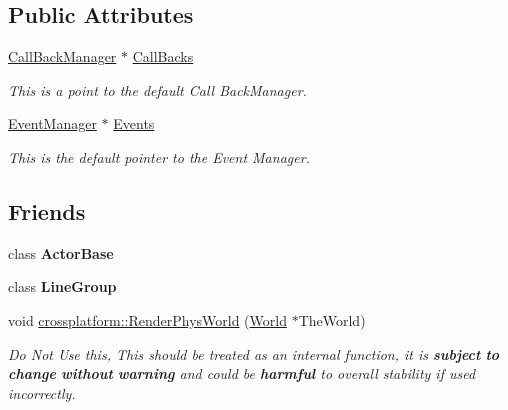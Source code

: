 \subsection*{Public Attributes}
\begin{DoxyCompactItemize}
\item 
\hyperlink{classphys_1_1CallBackManager}{CallBackManager} $\ast$ \hyperlink{classphys_1_1World_a22a1624c63198f49fdf8e448881bdb2e}{CallBacks}
\begin{DoxyCompactList}\small\item\em This is a point to the default Call BackManager. \item\end{DoxyCompactList}\item 
\hyperlink{classphys_1_1EventManager}{EventManager} $\ast$ \hyperlink{classphys_1_1World_ad0b13f1f3caf0342f56671b522543453}{Events}
\begin{DoxyCompactList}\small\item\em This is the default pointer to the Event Manager. \item\end{DoxyCompactList}\end{DoxyCompactItemize}
\subsection*{Friends}
\begin{DoxyCompactItemize}
\item 
\hypertarget{classphys_1_1World_ac09063d4b0192680ba3aa0bd4003a274}{
class {\bfseries ActorBase}}
\label{da/ddf/classphys_1_1World_ac09063d4b0192680ba3aa0bd4003a274}

\item 
\hypertarget{classphys_1_1World_ac3f02140b13e7e7a2c6134b4e7f03d1f}{
class {\bfseries LineGroup}}
\label{da/ddf/classphys_1_1World_ac3f02140b13e7e7a2c6134b4e7f03d1f}

\item 
void \hyperlink{classphys_1_1World_ac7946bdb41c7884bcd7cfdec2b5358f0}{crossplatform::RenderPhysWorld} (\hyperlink{classphys_1_1World}{World} $\ast$TheWorld)
\begin{DoxyCompactList}\small\item\em Do Not Use this, This should be treated as an internal function, it is {\bfseries subject} {\bfseries to} {\bfseries change} {\bfseries without} {\bfseries warning} and could be {\bfseries harmful} to overall stability if used incorrectly. \item\end{DoxyCompactList}\end{DoxyCompactItemize}


